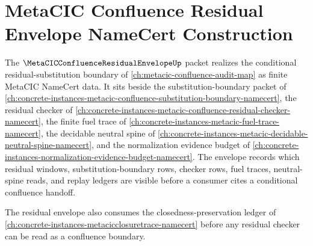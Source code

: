 \chapter{MetaCIC Confluence Residual Envelope NameCert Construction}
\label{ch:concrete-instances-metacic-confluence-residual-envelope-namecert}

The $\MetaCICConfluenceResidualEnvelopeUp$ packet realizes the conditional residual-substitution boundary of \autoref{ch:metacic-confluence-audit-map} as finite MetaCIC NameCert data. It sits beside the substitution-boundary packet of \autoref{ch:concrete-instances-metacic-confluence-substitution-boundary-namecert}, the residual checker of \autoref{ch:concrete-instances-metacic-confluence-residual-checker-namecert}, the finite fuel trace of \autoref{ch:concrete-instances-metacic-fuel-trace-namecert}, the decidable neutral spine of \autoref{ch:concrete-instances-metacic-decidable-neutral-spine-namecert}, and the normalization evidence budget of \autoref{ch:concrete-instances-normalization-evidence-budget-namecert}. The envelope records which residual windows, substitution-boundary rows, checker rows, fuel traces, neutral-spine reads, and replay ledgers are visible before a consumer cites a conditional confluence handoff.

The residual envelope also consumes the closedness-preservation ledger of \autoref{ch:concrete-instances-metacicclosuretrace-namecert} before any residual checker can be read as a confluence boundary.



